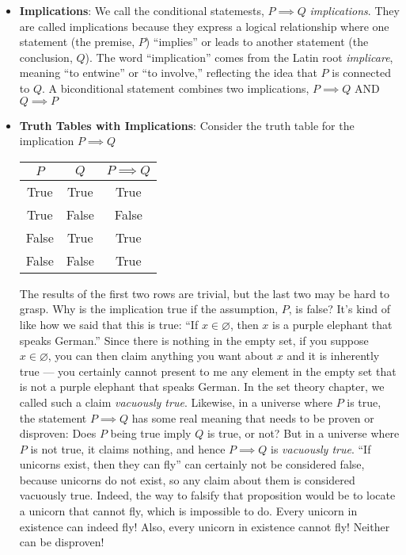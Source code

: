 \documentclass{report}
\begin{document}
\begin{itemize}
        \item \textbf{Implications}: We call the conditional statemests, $P \implies Q$ \textit{implications}. They are called implications because they express a logical relationship where one statement (the premise, $P$) ``implies'' or leads to another statement (the conclusion, $Q$). The word ``implication'' comes from the Latin root \textit{implicare}, meaning ``to entwine'' or ``to involve,'' reflecting the idea that $P$ is connected to $Q$.
            \bigbreak \noindent 
            A biconditional statement combines two implications, $P \implies Q$ AND $Q\implies P $
        \item \textbf{Truth Tables with Implications}: Consider the truth table for the implication $P\implies Q$
            \begin{center}
                \begin{tabular}{c|c|c}
                    $P$& $Q$ & $P\implies Q$ \\
                    \hline 
                    True & True  & True \\
                    True  & False & False \\
                    False & True & True \\
                    False & False & True
                \end{tabular}
            \end{center}
            The results of the first two rows are trivial, but the last two may be hard to grasp.
            \bigbreak \noindent 
            Why is the implication true if the assumption, $P$, is false? It’s kind of like how we said that this is true: “If $x \in \varnothing$, then $x$ is a purple elephant that speaks German.” Since there is nothing in the empty set, if you suppose $x \in \varnothing$, you can then claim anything you want about $x$ and it is inherently true — you certainly cannot present to me any element in the empty set that is not a purple elephant that speaks German. In the set theory chapter, we called such a claim \textit{vacuously true}. 
            \bigbreak \noindent 
            Likewise, in a universe where $P$ is true, the statement $P \implies Q$ has some real meaning that needs to be proven or disproven: Does $P$ being true imply $Q$ is true, or not? But in a universe where $P$ is not true, it claims nothing, and hence $P \implies Q$ is \textit{vacuously true}.
            \bigbreak \noindent 
            “If unicorns exist, then they can fly” can certainly not be considered false, because unicorns do not exist, so any claim about them is considered vacuously true. Indeed, the way to falsify that proposition would be to locate a unicorn that cannot fly, which is impossible to do. Every unicorn in existence can indeed fly! Also, every unicorn in existence cannot fly! Neither can be disproven!

\end{itemize}
\end{document}
